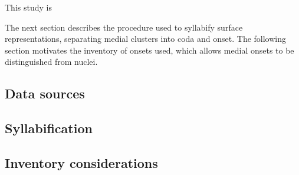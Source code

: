 
This study is 

The next section describes the procedure used to syllabify surface representations, separating medial clusters into coda and onset. The following section motivates the inventory of onsets used, which allows medial onsets to be distinguished from nuclei.

\subsection{Data sources}             
\subsection{Syllabification}          
\subsection{Inventory considerations} 
